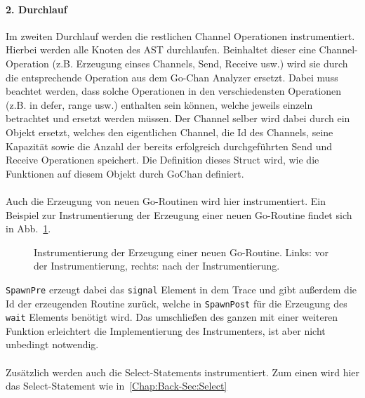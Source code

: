 \paragraph{2. Durchlauf} Im zweiten Durchlauf werden die restlichen 
Channel Operationen instrumentiert. Hierbei werden alle Knoten des 
AST durchlaufen. Beinhaltet dieser eine Channel-Operation (z.B. Erzeugung 
einses Channels, Send, Receive usw.) wird sie durch die entsprechende 
Operation aus dem Go-Chan Analyzer ersetzt. Dabei muss beachtet werden,
dass solche Operationen in den verschiedensten Operationen (z.B. in defer, 
range usw.) enthalten sein können, welche jeweils einzeln betrachtet und 
ersetzt werden müssen. Der Channel selber wird dabei durch ein Objekt ersetzt, 
welches den eigentlichen Channel, die Id des Channels, seine Kapazität sowie 
die Anzahl der bereits erfolgreich durchgeführten Send und Receive Operationen
speichert. Die Definition dieses Struct wird, wie die Funktionen auf diesem 
Objekt durch GoChan definiert.\\\\Auch die Erzeugung von neuen Go-Routinen 
wird hier instrumentiert. Ein Beispiel zur Instrumentierung der Erzeugung einer 
neuen Go-Routine findet sich in Abb.~\ref{Chap:Instrumenter-Sec:Instrumenter-Fig:GoRoutine}.
\begin{figure}[h!]
  \begin{minipage}[t]{0.3\textwidth}
    
  \end{minipage}
  \begin{minipage}[t]{0.65\textwidth}
    
  \end{minipage}
  \caption{Instrumentierung der Erzeugung einer neuen Go-Routine. Links: vor der 
    Instrumentierung, rechts: nach der Instrumentierung.}
  \label{Chap:Instrumenter-Sec:Instrumenter-Fig:GoRoutine}
\end{figure}
\texttt{SpawnPre} erzeugt dabei das \texttt{signal} Element in dem Trace 
und gibt außerdem die Id der erzeugenden Routine zurück, welche in \texttt{SpawnPost}
für die Erzeugung des \texttt{wait} Elements benötigt wird. Das umschließen 
des ganzen mit einer weiteren Funktion erleichtert die Implementierung 
des Instrumenters, ist aber nicht unbedingt notwendig.\\\\
Zusätzlich werden auch die Select-Statements instrumentiert. 
Zum einen wird hier das Select-Statement wie in~\ref{Chap:Back-Sec:Select} 
